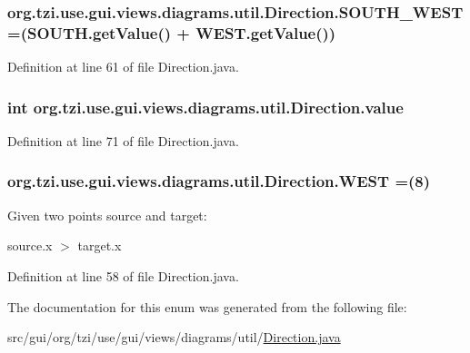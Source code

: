\hypertarget{enumorg_1_1tzi_1_1use_1_1gui_1_1views_1_1diagrams_1_1util_1_1_direction_af4b9aa63ec323f03e0437c726c83f371}{
\subsubsection[{S\-O\-U\-T\-H\-\_\-\-W\-E\-S\-T}]{\setlength{\rightskip}{0pt plus 5cm}org.\-tzi.\-use.\-gui.\-views.\-diagrams.\-util.\-Direction.\-S\-O\-U\-T\-H\-\_\-\-W\-E\-S\-T =(S\-O\-U\-T\-H.\-get\-Value() + W\-E\-S\-T.\-get\-Value())}}\label{enumorg_1_1tzi_1_1use_1_1gui_1_1views_1_1diagrams_1_1util_1_1_direction_af4b9aa63ec323f03e0437c726c83f371}


Definition at line 61 of file Direction.\-java.

\hypertarget{enumorg_1_1tzi_1_1use_1_1gui_1_1views_1_1diagrams_1_1util_1_1_direction_a768d8dfd1377fb7ca62f8b910f7446f5}{
\subsubsection[{value}]{\setlength{\rightskip}{0pt plus 5cm}int org.\-tzi.\-use.\-gui.\-views.\-diagrams.\-util.\-Direction.\-value}}\label{enumorg_1_1tzi_1_1use_1_1gui_1_1views_1_1diagrams_1_1util_1_1_direction_a768d8dfd1377fb7ca62f8b910f7446f5}


Definition at line 71 of file Direction.\-java.

\hypertarget{enumorg_1_1tzi_1_1use_1_1gui_1_1views_1_1diagrams_1_1util_1_1_direction_a668f50bff546f551535db3cf801de447}{
\subsubsection[{W\-E\-S\-T}]{\setlength{\rightskip}{0pt plus 5cm}org.\-tzi.\-use.\-gui.\-views.\-diagrams.\-util.\-Direction.\-W\-E\-S\-T =(8)}}\label{enumorg_1_1tzi_1_1use_1_1gui_1_1views_1_1diagrams_1_1util_1_1_direction_a668f50bff546f551535db3cf801de447}
Given two points {\ttfamily source} and {\ttfamily target}\-:\par
 {\ttfamily source.\-x $>$ target.\-x} 

Definition at line 58 of file Direction.\-java.



The documentation for this enum was generated from the following file\-:\begin{DoxyCompactItemize}
\item 
src/gui/org/tzi/use/gui/views/diagrams/util/\hyperlink{_direction_8java}{Direction.\-java}\end{DoxyCompactItemize}

